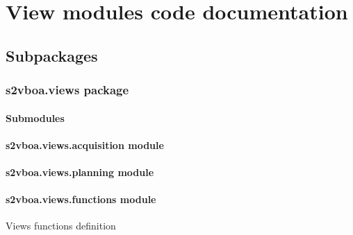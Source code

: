 \chapter{View modules code documentation}
\section{Subpackages}
\label{\detokenize{s2vboa:subpackages}}

\subsection{s2vboa.views package}
\label{\detokenize{s2vboa.views:s2vboa-views-package}}\label{\detokenize{s2vboa.views::doc}}

\subsubsection{Submodules}
\label{\detokenize{s2vboa.views:submodules}}

\subsubsection{s2vboa.views.acquisition module}
\label{\detokenize{s2vboa.views:module-s2vboa.views.acquisition}}\label{\detokenize{s2vboa.views:s2vboa-views-acquisition-module}}

\subsubsection{s2vboa.views.planning module}
\label{\detokenize{s2vboa.views:module-s2vboa.views.planning}}\label{\detokenize{s2vboa.views:s2vboa-views-planning-module}}

\subsubsection{s2vboa.views.functions module}
\label{\detokenize{s2vboa.views:module-s2vboa.views.functions}}\label{\detokenize{s2vboa.views:s2vboa-views-functions-module}}
\sphinxAtStartPar
Views functions definition

